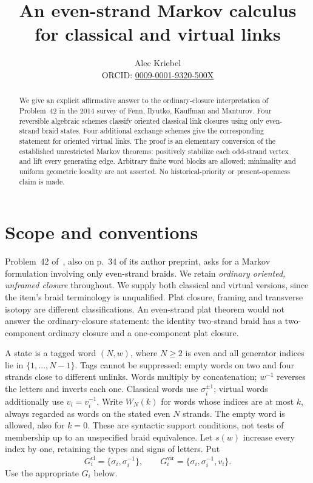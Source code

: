 \documentclass[11pt]{article}
\title{An even-strand Markov calculus for classical and virtual links}
\author{Alec Kriebel\\\small ORCID: \href{https://orcid.org/0009-0001-9320-500X}{0009-0001-9320-500X}}
\date{}
\newcommand{\sig}{\sigma}
\newcommand{\WB}[2]{W_{#1}(#2)}
\begin{document}
\maketitle
\begin{abstract}
We give an explicit affirmative answer to the ordinary-closure interpretation of
Problem~42 in the 2014 survey of Fenn, Ilyutko, Kauffman and Manturov.
Four reversible algebraic schemes classify oriented classical link closures
using only even-strand braid states. Four additional exchange schemes give the
corresponding statement for oriented virtual links. The proof is an elementary
conversion of the established unrestricted Markov theorems: positively stabilize
each odd-strand vertex and lift every generating edge. Arbitrary finite word
blocks are allowed; minimality and uniform geometric locality are not asserted.
No historical-priority or present-openness claim is made.
\end{abstract}

\section{Scope and conventions}
Problem~42 of~\cite[p.~37]{FIKM}, also on p.~34 of its author preprint,
asks for a Markov formulation involving only even-strand braids.
We retain \emph{ordinary oriented, unframed closure} throughout. We supply both
classical and virtual versions, since the item's braid terminology is unqualified.
Plat closure, framing and transverse isotopy are different classifications.
An even-strand plat theorem would not answer the ordinary-closure statement:
the identity two-strand braid has a two-component ordinary closure and a
one-component plat closure.

A state is a tagged word $(N,w)$, where $N\ge2$ is even and all generator
indices lie in $\{1,\ldots,N-1\}$. Tags cannot be suppressed: empty words on
two and four strands close to different unlinks. Words multiply by concatenation;
$w^{-1}$ reverses the letters and inverts each one. Classical words use
$\sig_i^{\pm1}$; virtual words additionally use $v_i=v_i^{-1}$.
Write $\WB{N}{k}$ for words whose indices are at most $k$, always regarded as
words on the stated even $N$ strands. The empty word is allowed, also for $k=0$.
These are syntactic support conditions, not tests of membership up to an
unspecified braid equivalence. Let $s(w)$ increase every index by one, retaining
the types and signs of letters. Put
\[
 G_i^{\mathrm{cl}}=\{\sig_i,\sig_i^{-1}\},\qquad
 G_i^{\mathrm{vir}}=\{\sig_i,\sig_i^{-1},v_i\}.
\]
Use the appropriate $G_i$ below.
\end{document}
